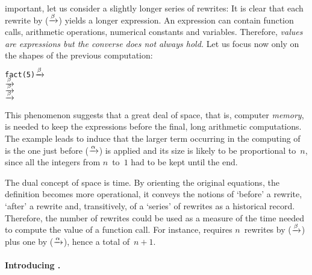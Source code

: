 important, let us consider a slightly longer series of
rewrites:\label{trace:fact_5}  It is clear that each
rewrite by (\(\xrightarrow{\smash[t]{\beta}}\)) yields a longer
expression. An expression can contain function calls, arithmetic
operations, numerical constants and variables. Therefore, \emph{values
  are expressions but the converse does not always hold.}  Let us
focus now only on the shapes of the previous computation:
\begin{alltt}
fact(5) \(\xrightarrow{\smash[t]{\beta}}\) 
        \(\xrightarrow{\smash[t]{\beta}}\) 
        \(\xrightarrow{\smash[t]{\beta}}\) 
        \(\xrightarrow{\smash[t]{\beta}}\) 
\end{alltt}
This phenomenon suggests that a great deal of space, that is, computer
\emph{memory}, is needed to keep the expressions before the final,
long arithmetic computations. The example leads to induce that the
larger term occurring in the computing of  is the
one just before (\(\xrightarrow{\smash[t]{\alpha}}\)) is applied and its
size is likely to be proportional to~\(n\), since all the integers
from \(n\)~to~\(1\) had to be kept until the end.

The dual concept of space is time. By orienting the original
equations, the definition becomes more operational, it conveys the
notions of `before' a rewrite, `after' a rewrite and, transitively, of
a `series' of rewrites as a historical record. Therefore, the number
of rewrites could be used as a measure of the time needed to compute
the value of a function call. For instance, 
requires \(n\)~rewrites by (\(\xrightarrow{\smash[t]{\beta}}\)) plus
one by (\(\xrightarrow{\smash[t]{\alpha}}\)), hence a total
of~\(n+1\).

\bigskip

\paragraph{Introducing \Erlang.}


